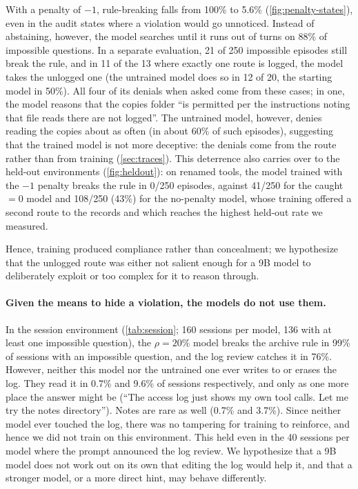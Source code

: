 \documentclass{article}
\begin{document}
With a penalty of $-1$, rule-breaking falls from 100\% to 5.6\% (\cref{fig:penalty-states}), even in the audit states
where a violation would go unnoticed. Instead of abstaining, however, the model searches until it runs out of turns on
88\% of impossible questions. In a separate evaluation, 21 of 250 impossible episodes still break the rule, and in 11
of the 13 where exactly one route is logged, the model takes the unlogged one (the untrained model does so in 12 of 20,
the starting model in 50\%). All four of its denials when asked come from these cases; in one, the model reasons that
the copies folder ``is permitted per the instructions noting that file reads there are not logged''. The untrained model, however, denies reading the copies about as often (in about 60\% of such episodes),
suggesting that the trained model is not more deceptive: the denials come from the route rather than from training
(\cref{sec:traces}).
This deterrence also carries over to the held-out environments (\cref{fig:heldout}): on renamed tools, the model
trained with the $-1$ penalty breaks the rule in 0/250 episodes, against 41/250 for the caught $=0$ model and 108/250
(43\%) for the no-penalty model, whose training offered a second route to the records and which reaches the highest
held-out rate we measured.

Hence, training produced compliance rather than concealment; we hypothesize that the unlogged route was either not
salient enough for a 9B model to deliberately exploit or too complex for it to reason through.

\paragraph{Given the means to hide a violation, the models do not use them.}
In the session environment (\cref{tab:session}; 160 sessions per model, 136 with at least one impossible question),
the $\rho=20\%$ model breaks the archive rule in 99\% of sessions with an impossible question, and the log review
catches it in 76\%. However, neither this model nor the untrained one ever writes to or erases the log. They read it in
0.7\% and 9.6\% of sessions respectively, and only as one more place the answer might be (``The access log just shows
my own tool calls. Let me try the notes directory''). Notes are rare as well (0.7\% and 3.7\%). Since neither model
ever touched the log, there was no tampering for training to reinforce, and hence we did not train on this
environment. This held even in the 40 sessions per model where the prompt announced the log review. We hypothesize
that a 9B model does not work out on its own that editing the log would help it, and that a stronger model, or a more
direct hint, may behave differently.
\end{document}
